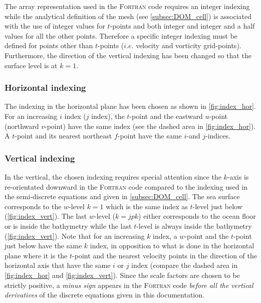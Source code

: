 \documentclass[../main/NEMO_manual]{subfiles}
\begin{document}
The array representation used in the \textsc{Fortran} code requires an integer indexing while
the analytical definition of the mesh (see \autoref{subsec:DOM_cell}) is associated with the use of
integer values for $t$-points and both integer and integer and a half values for all the other points.
Therefore a specific integer indexing must be defined for points other than $t$-points
($i.e.$ velocity and vorticity grid-points).
Furthermore, the direction of the vertical indexing has been changed so that the surface level is at $k=1$.

\subsubsection{Horizontal indexing}
\label{subsec:DOM_Num_Index_hor}

The indexing in the horizontal plane has been chosen as shown in \autoref{fig:index_hor}.
For an increasing $i$ index ($j$ index),
the $t$-point and the eastward $u$-point (northward $v$-point) have the same index
(see the dashed area in \autoref{fig:index_hor}).
A $t$-point and its nearest northeast $f$-point have the same $i$-and $j$-indices.

\subsubsection{Vertical indexing}
\label{subsec:DOM_Num_Index_vertical}

In the vertical, the chosen indexing requires special attention since
the $k$-axis is re-orientated downward in the \textsc{Fortran} code compared to
the indexing used in the semi-discrete equations and given in \autoref{subsec:DOM_cell}.
The sea surface corresponds to the $w$-level $k=1$ which is the same index as $t$-level just below
(\autoref{fig:index_vert}).
The last $w$-level ($k=jpk$) either corresponds to the ocean floor or is inside the bathymetry while
the last $t$-level is always inside the bathymetry (\autoref{fig:index_vert}).
Note that for an increasing $k$ index, a $w$-point and the $t$-point just below have the same $k$ index,
in opposition to what is done in the horizontal plane where
it is the $t$-point and the nearest velocity points in the direction of the horizontal axis that
have the same $i$ or $j$ index
(compare the dashed area in \autoref{fig:index_hor} and \autoref{fig:index_vert}).
Since the scale factors are chosen to be strictly positive, a \emph{minus sign} appears in the \textsc{Fortran} 
code \emph{before all the vertical derivatives} of the discrete equations given in this documentation.
\end{document}

